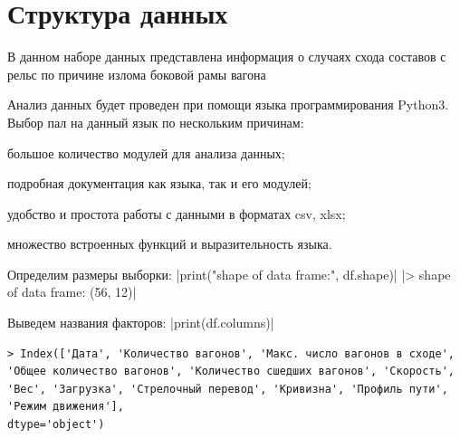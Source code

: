 \section{Структура данных}

В данном наборе данных представлена информация о случаях схода составов с рельс по причине излома боковой рамы вагона

Анализ данных будет проведен при помощи языка программирования Python3. Выбор пал на данный язык по нескольким причинам:
\begin{description}[font=$\bullet$]
\item большое количество модулей для анализа данных;
\item подробная документация как языка, так и его модулей;
\item удобство и простота работы с данными в форматах csv, xlsx;
\item множество встроенных функций и выразительность языка.
\end{description}

Определим размеры выборки:
|print("shape of data frame:", df.shape)|
|> shape of data frame: (56, 12)|

Выведем названия факторов:
|print(df.columns)|
\begin{verbatim}
> Index(['Дата', 'Количество вагонов', 'Макс. число вагонов в сходе',
'Общее количество вагонов', 'Количество сшедших вагонов', 'Скорость',
'Вес', 'Загрузка', 'Стрелочный перевод', 'Кривизна', 'Профиль пути',
'Режим движения'],
dtype='object')
\end{verbatim}

